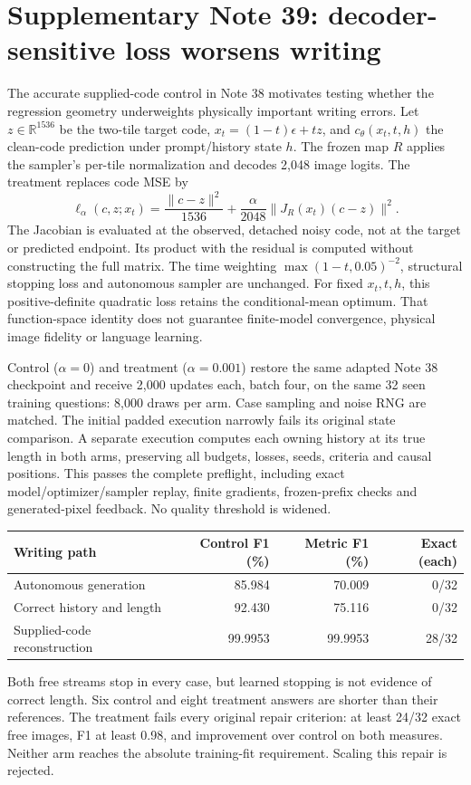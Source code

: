 \documentclass[10pt,a4paper]{article}
\begin{document}
\clearpage
\section*{Supplementary Note 39: decoder-sensitive loss worsens writing}
The accurate supplied-code control in Note 38 motivates testing whether the
regression geometry underweights physically important writing errors. Let
$z\in\mathbb R^{1536}$ be the two-tile target code, $x_t=(1-t)\epsilon+tz$,
and $c_\theta(x_t,t,h)$ the clean-code prediction under prompt/history state
$h$. The frozen map $R$ applies the sampler's per-tile normalization and
decodes 2,048 image logits. The treatment replaces code MSE by
\[
 \ell_\alpha(c,z;x_t)=\frac{\|c-z\|^2}{1536}
 +\frac{\alpha}{2048}\|J_R(x_t)(c-z)\|^2.
\]
The Jacobian is evaluated at the observed, detached noisy code, not at the
target or predicted endpoint. Its product with the residual is computed
without constructing the full matrix. The time weighting
$\max(1-t,0.05)^{-2}$, structural stopping loss and autonomous sampler are
unchanged. For fixed $x_t,t,h$, this positive-definite quadratic loss retains
the conditional-mean optimum. That function-space identity does not guarantee
finite-model convergence, physical image fidelity or language learning.

Control ($\alpha=0$) and treatment ($\alpha=0.001$) restore the same adapted
Note 38 checkpoint and receive 2,000 updates each, batch four, on the same
32 seen training questions: 8,000 draws per arm. Case sampling and noise RNG
are matched. The initial padded execution narrowly fails its original state
comparison. A separate execution computes each owning history at its true
length in both arms, preserving all budgets, losses, seeds, criteria and
causal positions. This passes the complete preflight, including exact
model/optimizer/sampler replay, finite gradients, frozen-prefix checks and
generated-pixel feedback. No quality threshold is widened.

\begin{center}\small
\begin{tabular}{lrrr}
\toprule
Writing path & Control F1 (\%) & Metric F1 (\%) & Exact (each)\\
\midrule
Autonomous generation & 85.984 & 70.009 & 0/32\\
Correct history and length & 92.430 & 75.116 & 0/32\\
Supplied-code reconstruction & 99.9953 & 99.9953 & 28/32\\
\bottomrule
\end{tabular}
\end{center}
Both free streams stop in every case, but learned stopping is not evidence
of correct length. Six control and eight treatment answers are shorter than
their references. The treatment fails every original repair criterion:
at least 24/32 exact free images, F1 at least 0.98, and improvement over
control on both measures. Neither arm reaches the absolute training-fit
requirement. Scaling this repair is rejected.
\end{document}
